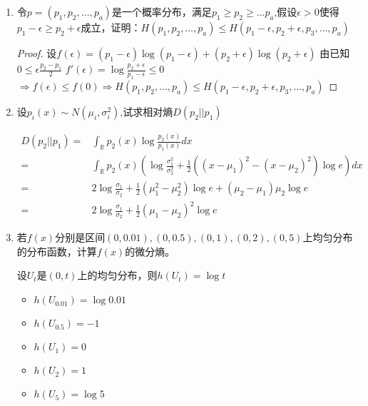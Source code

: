 \documentclass[a4paper]{article}
\begin{document}
\begin{enumerate}
\begin{proof}
\begin{align*}
=& H(X)+H(Y)-H(X,Y)-(H(X,Z)-H(Z))+H(X,Y,Z)-H(Y,Z)\\
=& H(X,Y,Z)-H(X)-H(Y)-H(Z)+(H(X)+H(Y)-H(X,Y))\\
+&(H(Y)+H(Z)-H(Y,Z))+(H(Z)+H(X)-H(X,Z))\\
=& H(X,Y,Z)-H(X)-H(Y)-H(Z)+I(X;Y)+I(Y;Z)+I(Z;X)
\end{align*}
\end{proof}
\item 令$p=(p_1,p_2,\dots,p_a)$是一个概率分布，满足$p_1\geq p_2\geq \dots p_a$,假设$\epsilon >0 $使得$p_1-\epsilon \geq p_2+\epsilon$成立，证明：$H(p_1,p_2,\dots,p_a)
\leq H(p_1-\epsilon,p_2+\epsilon,p_3,\dots,p_a)$
\begin{proof}
设$f(\epsilon)=(p_1-\epsilon)\log(p_1-\epsilon)+(p_2+\epsilon)\log(p_2+\epsilon)$
由已知$0\leq \epsilon \frac{p_2-p_1}{2}$
$f'(\epsilon)=\log\frac{p_2+\epsilon}{p_1-\epsilon}\leq 0$
$\Rightarrow f(\epsilon)\leq f(0)\Rightarrow H(p_1,p_2,\dots,p_a)\leq H(p_1-\epsilon,p_2+\epsilon,p_3,\dots,p_a)$
\end{proof}
\item 设$p_i(x)\sim N(\mu_i,\sigma_i^2)$,试求相对熵$D(p_2||p_1)$
\begin{solution}
\begin{align*}
D(p_2||p_1)=& \int_{\mathbb{R}} p_2(x) \log \frac{p_2(x)}{p_1(x)}dx\\
=& \int_{\mathbb{R}} p_2(x) \left(\log \frac{\sigma_1^2}{\sigma_2^2}+\frac{1}{2}((x-\mu_1)^2-(x-\mu_2)^2)\log e\right)dx\\
=& 2\log \frac{\sigma_1}{\sigma_2}+\frac{1}{2}(\mu_1^2-\mu_2^2)\log e+(\mu_2-\mu_1)\mu_2\log e\\
=& 2\log \frac{\sigma_1}{\sigma_2}+\frac{1}{2}(\mu_1-\mu_2)^2\log e
\end{align*}
\end{solution}
\item 若$f(x)$分别是区间$(0,0.01),(0,0.5),(0,1),(0,2),(0,5)$上均匀分布的分布函数，计算$f(x)$的微分熵。
\begin{solution}
设$U_t$是$(0,t)$上的均匀分布，则$h(U_t)=\log t$
\begin{itemize}
\item $h(U_{0.01})=\log 0.01$
\item $h(U_{0.5})=-1$
\item $h(U_{1})=0$
\item $h(U_{2})=1$
\item $h(U_{5})=\log 5$
\end{itemize}
\end{solution}

\end{enumerate}
\end{document}
